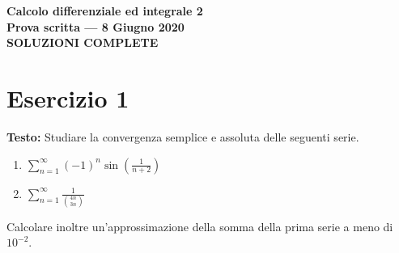 \documentclass[12pt, a4paper]{article}
\begin{document}
\begin{center}
\Large\textbf{Calcolo differenziale ed integrale 2}\\
\large\textbf{Prova scritta --- 8 Giugno 2020}\\
\large\textbf{SOLUZIONI COMPLETE}
\end{center}

\vspace{1cm}

\section*{Esercizio 1}

\textbf{Testo:} Studiare la convergenza semplice e assoluta delle seguenti serie.
\begin{enumerate}
    \item $\displaystyle\sum_{n=1}^{\infty} (-1)^{n} \sin\left(\frac{1}{n+2}\right)$
    \item $\displaystyle\sum_{n=1}^{\infty} \frac{1}{\binom{4n}{3n}}$
\end{enumerate}
Calcolare inoltre un'approssimazione della somma della prima serie a meno di $10^{-2}$.
\end{document}
